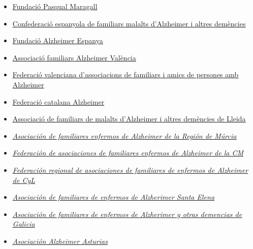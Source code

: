 \documentclass[a4paper,12pt]{report}
\begin{document}
\begin{itemize}
    \item \href{https://fpmaragall.org/ca/}{\underline{Fundació Pasqual Maragall}}
    \item \href{https://www.ceafa.es/es}{\underline{Confederació espanyola de familiars malalts d'Alzheimer i altres demències}}
    \item \href{http://www.alzfae.org/}{\underline{Fundació Alzheimer Espanya}}
    \item \href{https://www.afav.org/}{\underline{Associació familiars Alzheimer València}}
    \item \href{https://www.fevafa.org/quienes-somos/}{\underline{Federació valenciana d'associacions de familiars i amics de persones amb Alzheimer}}
    \item \href{https://www.fafac.cat/}{\underline{Federació catalana Alzheimer}}
    \item \href{http://www.lleidaparticipa.cat/index_web.php?idwc=czoxNToiYWx6aGVpbWVybGxlaWRhIjs=}{\underline{Associació de familiars de malalts d'Alzheimer i altres demències de Lleida}}
    \item \href{https://afamur.es/que-es-afamur/}{\underline{\textit{Asociación de familiares enfermos de Alzheimer de la Región de Múrcia}}}
    \item \href{https://fafal.org/}{\underline{\textit{Federación de asociaciones de familiares enfermos de Alzheimer de la CM}}}
    \item \href{https://www.afacayle.es/}{\underline{\textit{Federación regional de asociaciones de familiares de enfermos de Alzheimer de CyL}}}
    \item \href{https://www.alzheimersevilla.com/}{\underline{\textit{Asociación de familiares de enfermos de Alzherimer Santa Elena}}}
    \item \href{https://afaga.com/es/asociacion/historia/}{\underline{\textit{Asociación de familiares de enfermos de Alzherimer y otras demencias de Galicia}}}
    \item \href{https://www.asociacionalzheimer.com/}{\underline{\textit{Asociación Alzheimer Asturias}}}
\end{itemize}
\end{document}
